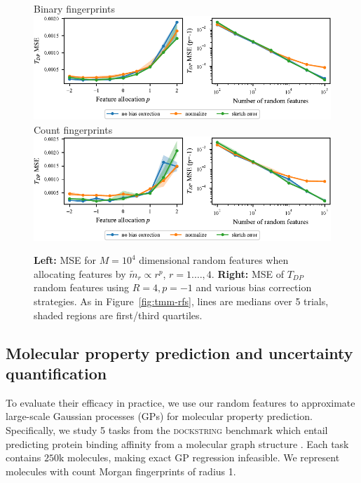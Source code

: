 \begin{figure}
    \centering
    {Binary fingerprints} \\
    \includegraphics{chapter0x-TRF/new-figures/tdp_feat_alloc_and_overall_error_binary.pdf} \\
    {Count fingerprints}\\
    \includegraphics{chapter0x-TRF/new-figures/tdp_feat_alloc_and_overall_error_count.pdf}
    \caption[Errors of TDP random features on real data.]{
    \textbf{Left:} MSE for $M=10^4$ dimensional random features when allocating features by $\tilde{m}_r\propto r^p$, $r=1.\ldots,4$.
    \textbf{Right:}  MSE of $T_{DP}$ random features using $R=4,p=-1$ and various bias correction strategies.
    As in Figure~\ref{fig:tmm-rfs}, lines are medians over 5 trials, shaded regions are first/third quartiles.
    }
    \label{fig:tdp-total-rf}
\end{figure}




\subsection{Molecular property prediction and uncertainty quantification}\label{sec:regression-expt}

To evaluate their efficacy in practice, we use our random features to approximate large-scale Gaussian processes (GPs) \citep{rasmussen2006gp}
for molecular property prediction.
Specifically, we study 5 tasks from the \textsc{dockstring} benchmark 
which entail predicting protein binding affinity from a molecular graph structure \citep{ortegon2021dockstring}.
Each task contains $250\mathrm{k}$ molecules, making exact GP regression infeasible. 
We represent molecules with count Morgan fingerprints of radius 1.

